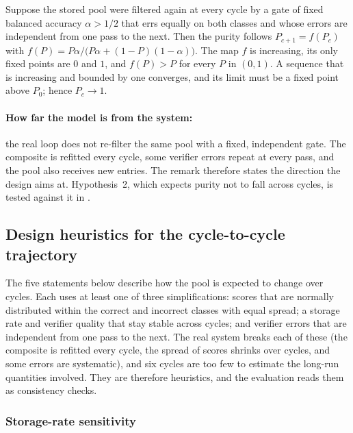 \begin{remark}
\label{thm:bayes-convergence}
Suppose the stored pool were filtered again at every cycle by a gate of fixed balanced accuracy $\alpha > 1/2$ that errs equally on both classes and whose errors are independent from one pass to the next. Then the purity follows $P_{c+1} = f(P_c)$ with $f(P) = P\alpha / \big(P\alpha + (1-P)(1-\alpha)\big)$. The map $f$ is increasing, its only fixed points are $0$ and $1$, and $f(P) > P$ for every $P$ in $(0,1)$. A sequence that is increasing and bounded by one converges, and its limit must be a fixed point above $P_0$; hence $P_c \to 1$.
\end{remark}

\paragraph{How far the model is from the system:} the real loop does not re-filter the same pool with a fixed, independent gate. The composite is refitted every cycle, some verifier errors repeat at every pass, and the pool also receives new entries. The remark therefore states the direction the design aims at. Hypothesis~2, which expects purity not to fall across cycles, is tested against it in .

\subsection{Design heuristics for the cycle-to-cycle trajectory}
\label{sec:theory-heuristics}

The five statements below describe how the pool is expected to change over cycles. Each uses at least one of three simplifications: scores that are normally distributed within the correct and incorrect classes with equal spread; a storage rate and verifier quality that stay stable across cycles; and verifier errors that are independent from one pass to the next. The real system breaks each of these (the composite is refitted every cycle, the spread of scores shrinks over cycles, and some errors are systematic), and six cycles are too few to estimate the long-run quantities involved. They are therefore heuristics, and the evaluation reads them as consistency checks.

\subsubsection{Storage-rate sensitivity}
\label{sec:theorem-monotonicity}

